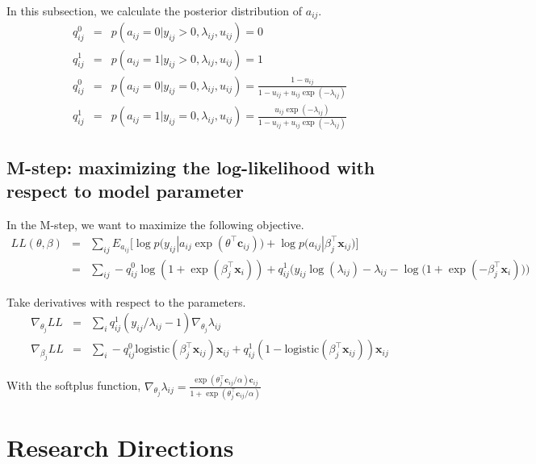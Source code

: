 \documentclass{article}
\begin{document}
In this subsection, we calculate the posterior distribution of $a_{ij}$.
\begin{eqnarray}
q_{ij}^{0} &=& p(a_{ij} = 0 | y_{ij} > 0, \lambda_{ij}, u_{ij}) =  0 \\
q_{ij}^{1} &=& p(a_{ij} = 1 | y_{ij} > 0, \lambda_{ij}, u_{ij}) =  1 \\[10pt]
q_{ij}^{0} &=& p(a_{ij} = 0 | y_{ij} = 0, \lambda_{ij}, u_{ij}) =  \frac{1 - u_{ij}}{1 - u_{ij} + u_{ij}\exp(-\lambda_{ij})} \\
q_{ij}^{1} &=& p(a_{ij} = 1 | y_{ij} = 0, \lambda_{ij}, u_{ij}) =  \frac{u_{ij}\exp(-\lambda_{ij})}{1 - u_{ij} + u_{ij}\exp(-\lambda_{ij})}
\end{eqnarray}


\subsection{M-step: maximizing the log-likelihood with respect to model parameter}

In the M-step, we want to maximize the following objective. 
\begin{eqnarray}
LL(\theta, \beta) &=& \sum_{ij} E_{a_{ij}} \Big[\log p\big(y_{ij} | a_{ij} \exp(\theta^\top \mathbf{c}_{ij})\big) + \log p\big(a_{ij} | \beta_j^\top \mathbf{x}_{ij}\big)\Big] \nonumber\\
&=& \sum_{ij}  - q_{ij}^0 \log (1 +  \exp(\beta_j^\top \mathbf{x}_i)) + q_{ij}^1 \Big( y_{ij}\log(\lambda_{ij}) - \lambda_{ij} - \log \big(1 + \exp( - \beta_j^\top \mathbf{x}_i) \big) \Big) \nonumber
\end{eqnarray}

Take derivatives with respect to the parameters. 
\begin{eqnarray}
\nabla_{\theta_j} LL &=& \sum_{i}  q_{ij}^1 \left( y_{ij}/\lambda_{ij} - 1 \right)
\nabla_{\theta_j} \lambda_{ij} \\
\nabla_{\beta_j} LL  &=& \sum_{i} - q_{ij}^0 \mathrm{logistic}(\beta_j^\top \mathbf{x}_{ij}) \mathbf{x}_{ij} + q_{ij}^1 (1 - \mathrm{logistic}(\beta_j^\top \mathbf{x}_{ij})) \mathbf{x}_{ij}
\end{eqnarray}

With the softplus function, $\nabla_{\theta_j} \lambda_{ij} = \frac{\exp(\theta_j^\top \mathbf{c}_{ij} / \alpha) \mathbf{c}_{ij}}{1 + \exp(\theta_j^\top \mathbf{c}_{ij} / \alpha)}$

\section{Research Directions}
\end{document}
